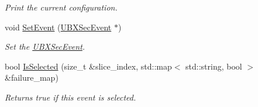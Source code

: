 \begin{DoxyCompactItemize}
\begin{DoxyCompactList}\small\item\em Print the current configuration. \end{DoxyCompactList}\item 
\hypertarget{classubana_1_1NuMuCCEventSelection_aab2612c63b22127e3d3909c8fdd8b9b7}{void \hyperlink{classubana_1_1NuMuCCEventSelection_aab2612c63b22127e3d3909c8fdd8b9b7}{Set\-Event} (\hyperlink{classUBXSecEvent}{U\-B\-X\-Sec\-Event} $\ast$)}\label{classubana_1_1NuMuCCEventSelection_aab2612c63b22127e3d3909c8fdd8b9b7}

\begin{DoxyCompactList}\small\item\em Set the \hyperlink{classUBXSecEvent}{U\-B\-X\-Sec\-Event}. \end{DoxyCompactList}\item 
\hypertarget{classubana_1_1NuMuCCEventSelection_af1fce817e5534d638d2a18fbc6ce25dd}{bool \hyperlink{classubana_1_1NuMuCCEventSelection_af1fce817e5534d638d2a18fbc6ce25dd}{Is\-Selected} (size\-\_\-t \&slice\-\_\-index, std\-::map$<$ std\-::string, bool $>$ \&failure\-\_\-map)}\label{classubana_1_1NuMuCCEventSelection_af1fce817e5534d638d2a18fbc6ce25dd}

\begin{DoxyCompactList}\small\item\em Returns true if this event is selected. \end{DoxyCompactList}\end{DoxyCompactItemize}
